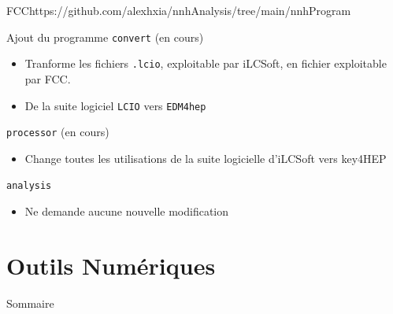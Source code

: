 \documentclass[9pt]{beamer}
\begin{document}
\begin{frame}{FCC}{https://github.com/alexhxia/nnhAnalysis/tree/main/nnhProgram}

	\begin{block}{Ajout du programme \texttt{convert} (en cours)}
		\begin{itemize}
			\item Tranforme les fichiers \texttt{.lcio}, exploitable par iLCSoft, en fichier exploitable par FCC.
			\item De la suite logiciel \texttt{LCIO} vers \texttt{EDM4hep}
		\end{itemize}
	\end{block}

	\begin{block}{\texttt{processor} (en cours)}
		\begin{itemize}
			\item Change toutes les utilisations de la suite logicielle d'iLCSoft vers key4HEP
		\end{itemize}
	\end{block}

	\begin{block}{\texttt{analysis}}
		\begin{itemize}
			\item Ne demande aucune nouvelle modification
		\end{itemize}
	\end{block}

\end{frame}


\section{Outils Numériques}

\begin{frame}{Sommaire}
	\begin{columns}[onlytextwidth,T]
        \begin{column}{.45\textwidth}
            \tableofcontents[currentsection, sections=1-2]
        \end{column}
        \begin{column}{.45\textwidth}
            \tableofcontents[currentsection, sections=3-5]
        \end{column}
    \end{columns}
\end{frame}
\end{document}
